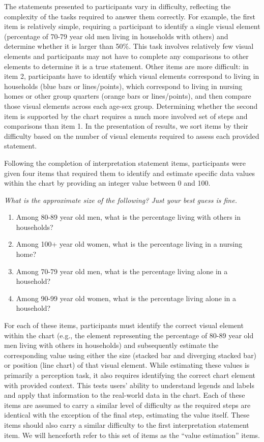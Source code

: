\documentclass{IEEEcsmag}
\begin{document}
The statements presented to participants vary in difficulty, reflecting the complexity of the tasks required to answer them correctly. For example, the first item is relatively simple, requiring a participant to identify a single visual element (percentage of 70-79 year old men living in households with others) and determine whether it is larger than 50\%. This task involves relatively few visual elements and participants may not have to complete any comparisons to other elements to determine it is a true statement. Other items are more difficult: in item 2, participants have to identify which visual elements correspond to living in households (blue bars or lines/points), which correspond to living in nursing homes or other group quarters (orange bars or lines/points), and then compare those visual elements across each age-sex group. Determining whether the second item is supported by the chart requires a much more involved set of steps and comparisons than item 1. In the presentation of results, we sort items by their difficulty based on the number of visual elements required to assess each provided statement.

Following the completion of interpretation statement items, participants were given four items that required them to identify and estimate specific data values within the chart by providing an integer value between 0 and 100.

\emph{What is the approximate size of the following? Just your best guess is fine.}

\begin{enumerate}
  \item{Among 80-89 year old men, what is the percentage living with others in households?}
  \item{Among 100+ year old women, what is the percentage living in a nursing home?}
  \item{Among 70-79 year old men, what is the percentage living alone in a household?}
  \item{Among 90-99 year old women, what is the percentage living alone in a household?}
  \end{enumerate}

For each of these items, participants must identify the correct visual element within the chart (e.g., the element representing the percentage of 80-89 year old men living with others in households) and subsequently estimate the corresponding value using either the size (stacked bar and diverging stacked bar) or position (line chart) of that visual element. While estimating these values is primarily a perception task, it also requires identifying the correct chart element with provided context. This tests users' ability to understand legends and labels and apply that information to the real-world data in the chart. Each of these items are assumed to carry a similar level of difficulty as the required steps are identical with the exception of the final step, estimating the value itself. These items should also carry a similar difficulty to the first interpretation statement item. We will henceforth refer to this set of items as the ``value estimation'' items.
\end{document}
